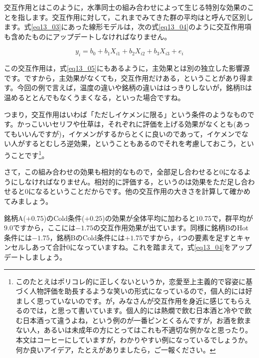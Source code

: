 \documentclass{ltjbook}
\begin{document}
交互作用とはこのように，水準同士の組み合わせによって生じる特別な効果のことを指します。交互作用に対して，これまでみてきた群の平均はと呼んで区別します。式\ref{eq13_03}にあった線形モデルは，次の式\ref{eq13_04}のように交互作用項も含めたものにアップデートしなければなりません。

\begin{equation}
	\label{eq13_05}
	y_i = b_0 + b_1 X_{i1}+ b_2 X_{i2} + b_3 X_{i3} + e_{i}
\end{equation}

この交互作用は，式\ref{eq13_05}にもあるように，主効果とは別の独立した影響源です。ですから，主効果がなくても，交互作用だけある，ということがあり得ます。今回の例で言えば，温度の違いや銘柄の違いははっきりしないが，銘柄Bは温めるととんでもなくうまくなる，といった場合ですね。

つまり，交互作用はいわば「ただしイケメンに限る」という条件のようなものです。かっこいいセリフや仕草は，それぞれに評価を上げる効果がなくとも(あってもいいんですが)，イケメンがするからとくに良いのであって，イケメンでない人がするとむしろ逆効果，ということもあるのでそれを考慮しておこう，ということです\footnote{このたとえはポリコレ的に正しくないというか，恋愛至上主義的で容姿に基づく人物評価を助長するような笑いの形式になっているので，個人的には好ましく思っていないのです。が，みなさんが交互作用を身近に感じてもらえるのでは，と思って書いています。個人的には熱燗で飲む日本酒と冷やで飲む日本酒って違うよね，という例のが一番ピンとくるんですが，お酒を飲まない人，あるいは未成年の方にとってはこれも不適切な例かなと思ったり。本文はコーヒーにしていますが，わかりやすい例になっているでしょうか。何か良いアイデア，たとえがありましたら，ご一報ください。}。

さて，この組み合わせの効果も相対的なもので，全部足し合わせると$0$になるようにしなければなりません。相対的に評価する，というのは効果をただ足し合わせると$0$になるということだからです。他の交互作用の大きさを計算して確かめてみましょう。

銘柄A($+0.75$)のCold条件($+0.25$)の効果が全体平均に加わると$10.75$で，群平均が$9.0$ですから，ここには$-1.75$の交互作用効果が出ています。同様に銘柄BのHot条件には$-1.75$，銘柄BのCold条件には$+1.75$ですから，4つの要素を足すとキャンセルしあって合計$0$になっていますね。これを踏まえて，式\ref{eq13_04}をアップデートしましょう。
\end{document}
